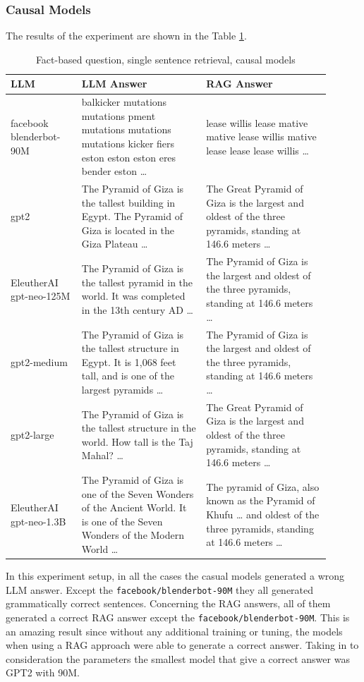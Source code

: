 \documentclass{wseas}
\begin{document}
\subsubsection{Causal Models}

The results of the experiment are shown in the Table \ref{tab:experiment_R_1_sentence_Q_fact_M_casual_table}.
\begin{table}[htbp]
  \centering
  \caption{Fact-based question, single sentence retrieval, causal models}
  \label{tab:experiment_R_1_sentence_Q_fact_M_casual_table}
    \begin{tabular}{|p{0.20\linewidth}|p{0.35\linewidth}|p{0.35\linewidth}|}
      \hline
      \textbf{LLM} & \textbf{LLM Answer} & \textbf{RAG Answer} \\ \hline
      facebook blenderbot-90M & balkicker mutations mutations pment mutations mutations mutations kicker fiers eston eston eston eres bender eston \ldots{} & lease willis lease mative mative lease willis mative lease lease lease willis \ldots{} \\ \hline
      gpt2 & The Pyramid of Giza is the tallest building in Egypt. The Pyramid of Giza is located in the Giza Plateau \ldots{} & The Great Pyramid of Giza is the largest and oldest of the three pyramids, standing at 146.6 meters \ldots{} \\ \hline
      EleutherAI gpt-neo-125M & The Pyramid of Giza is the tallest pyramid in the world. It was completed in the 13th century AD \ldots{} & The Pyramid of Giza is the largest and oldest of the three pyramids, standing at 146.6 meters \ldots{} \\ \hline
      gpt2-medium & The Pyramid of Giza is the tallest structure in Egypt. It is 1,068 feet tall, and is one of the largest pyramids \ldots{} & The Pyramid of Giza is the largest and oldest of the three pyramids, standing at 146.6 meters \ldots{} \\ \hline
      gpt2-large & The Pyramid of Giza is the tallest structure in the world. How tall is the Taj Mahal? \ldots{} & The Great Pyramid of Giza is the largest and oldest of the three pyramids, standing at 146.6 meters \ldots{} \\ \hline
      EleutherAI gpt-neo-1.3B & The Pyramid of Giza is one of the Seven Wonders of the Ancient World. It is one of the Seven Wonders of the Modern World \ldots{} & The pyramid of Giza, also known as the Pyramid of Khufu \ldots{} and oldest of the three pyramids, standing at 146.6 meters \ldots{} \\ \hline
    \end{tabular}
\end{table}
In this experiment setup, in all the cases the casual models generated a wrong LLM answer. Except
the \texttt{facebook/blenderbot-90M} they all generated grammatically
correct sentences. Concerning the RAG answers, all of them generated a
correct RAG answer except the \texttt{facebook/blenderbot-90M}. This is
an amazing result since without any additional training or tuning, the
models when using a RAG approach were able to generate a correct answer.
Taking in to consideration the parameters the smallest model that give a
correct answer was GPT2 with 90M.
\end{document}
